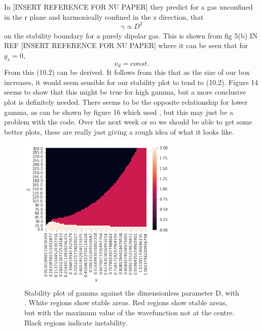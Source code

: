 \documentclass[10pt]{article}
\numberwithin{equation}{section}
\begin{document}
\begin{multicols}{2}
In [INSERT REFERENCE FOR NU PAPER] they predict for a gas unconfined in the r plane and harmonically confined in the z direction, that
\begin{equation}
\gamma\propto D^{2}
\end{equation} 
on the stability boundary for a purely dipolar gas. This is shown from fig 5(b) IN REF [INSERT REFERENCE FOR NU PAPER] where it can be seen that for $g_{s} =0$,
\begin{equation}
 \nu_{d}=const.
\end{equation}
From this (10.2) can be derived. It follows from this that as the size of our box increases, it would seem sensible for our stability plot to tend to (10.2). Figure 14 seems to show that this might be true for high gamma, but a more conclusive plot is definitely needed. There seems to be the opposite relationship for lower gamma, as can be shown by figure 16 which used , but this may just be a problem with the code. Over the next week or so we should be able to get some better plots, these are really just giving a rough idea of what it looks like.

\begin{figure}[H]
\centering
\includegraphics[width=\linewidth]{stablebox1}
\caption{Stability plot of gamma against the dimensionless parameter D, with . White regions show stable areas. Red regions show stable areas, but with the maximum value of the wavefunction not at the centre. Black regions indicate instability.}
\end{figure}


\end{multicols}
\end{document}
